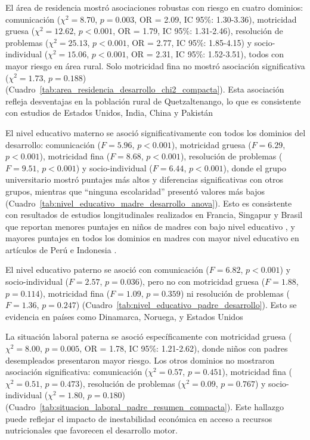 \documentclass[11pt,letterpaper]{report}
\begin{document}
El área de residencia mostró asociaciones robustas con riesgo en cuatro 
dominios: comunicación ($\chi^2 = 8.70$, $p = 0.003$, OR = 2.09, 
IC 95\%: 1.30-3.36), motricidad gruesa ($\chi^2 = 12.62$, $p < 0.001$, 
OR = 1.79, IC 95\%: 1.31-2.46), resolución de problemas ($\chi^2 = 25.13$, 
$p < 0.001$, OR = 2.77, IC 95\%: 1.85-4.15) y socio-individual 
($\chi^2 = 15.06$, $p < 0.001$, OR = 2.31, IC 95\%: 1.52-3.51), todos con 
mayor riesgo en área rural. Solo motricidad fina no mostró asociación 
significativa ($\chi^2 = 1.73$, $p = 0.188$) 
(Cuadro~\ref{tab:area_residencia_desarrollo_chi2_compacta}). Esta asociación
refleja desventajas en la población rural de Quetzaltenango, lo que es consistente con estudios de Estados Unidos, India, China y Pakistán \cite{Zablotsky2020-tb,Chatterjee2020,Murthy2020,Wang2020,Avan2010}

El nivel educativo materno se asoció significativamente con todos los dominios 
del desarrollo: comunicación ($F = 5.96$, $p < 0.001$), motricidad gruesa 
($F = 6.29$, $p < 0.001$), motricidad fina ($F = 8.68$, $p < 0.001$), 
resolución de problemas ($F = 9.51$, $p < 0.001$) y socio-individual 
($F = 6.44$, $p < 0.001$), donde el grupo universitario mostró puntajes más 
altos y diferencias significativas con otros grupos, mientras que ``ninguna 
escolaridad'' presentó valores más bajos 
(Cuadro~\ref{tab:nivel_educativo_madre_desarrollo_anova}). Esto es consistente
con resultados de estudios longitudinales realizados en Francia, Singapur y Brasil que reportan menores puntajes en niños de madres con bajo nivel educativo \cite{Charkaluk2024,Lockhart2023,Yeleswarapu2025,Munhoz2022}, y mayores puntajes en todos los dominios en madres con mayor nivel educativo en artículos de Perú e Indonesia \cite{Handal2007,Hanifah2022}.


El nivel educativo 
paterno se asoció con comunicación ($F = 6.82$, $p < 0.001$) y socio-individual 
($F = 2.57$, $p = 0.036$), pero no con motricidad gruesa ($F = 1.88$, 
$p = 0.114$), motricidad fina ($F = 1.09$, $p = 0.359$) ni resolución de 
problemas ($F = 1.36$, $p = 0.247$) 
(Cuadro~\ref{tab:nivel_educativo_padre_desarrollo}). Esto se evidencia en países como Dinamarca, Noruega, y Estados Unidos \cite{Holstein2021,Torvik2020,Sauver2004}

La situación laboral paterna se asoció específicamente con motricidad gruesa 
($\chi^2 = 8.00$, $p = 0.005$, OR = 1.78, IC 95\%: 1.21-2.62), donde niños 
con padres desempleados presentaron mayor riesgo. Los otros dominios no 
mostraron asociación significativa: comunicación ($\chi^2 = 0.57$, $p = 0.451$), 
motricidad fina ($\chi^2 = 0.51$, $p = 0.473$), resolución de problemas 
($\chi^2 = 0.09$, $p = 0.767$) y socio-individual ($\chi^2 = 1.80$, 
$p = 0.180$) (Cuadro~\ref{tab:situacion_laboral_padre_resumen_compacta}). 
Este hallazgo puede reflejar el impacto de inestabilidad económica en 
acceso a recursos nutricionales que favorecen el desarrollo motor.
\end{document}
